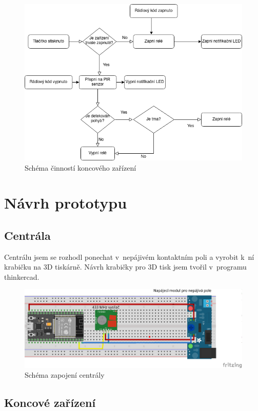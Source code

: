 \documentclass[11pt,a4paper,twoside,openright]{report}
\begin{document}
	\begin{figure}[htb]
		\centering
		\includegraphics[width=1\hsize]{img/schema_koncove_zarizeni.png}
		\caption{Schéma činností koncového zařízení}\end{figure}
	
	\section{Návrh prototypu}
	\subsection{Centrála}
	
	Centrálu jsem se rozhodl ponechat v~nepájivém kontaktním poli a vyrobit k~ní krabičku na 3D tiskárně. Návrh krabičky pro 3D tisk jsem tvořil v~programu thinkercad. 
	
	\begin{figure}[htb]
		\centering
		\includegraphics[width=1\hsize]{img/centrala_bb.png}
		\caption{Schéma zapojení centrály}\end{figure}
	
	\subsection{Koncové zařízení}
	
\end{document}
